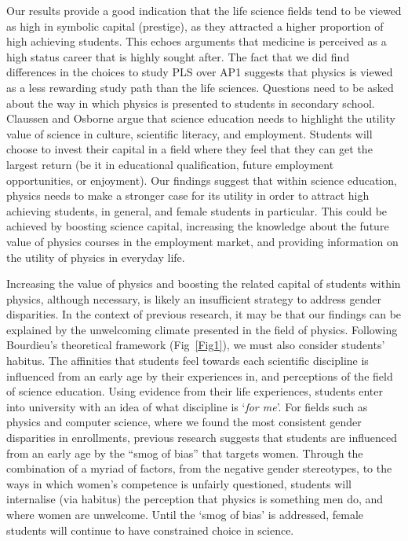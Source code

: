 Our results provide a good indication that the life science fields tend to be viewed as high in symbolic capital (prestige), as they attracted a higher proportion of high achieving students. This echoes arguments that medicine is perceived as a high status career that is highly sought after.\cite{Wong2012} The fact that we did find differences in the choices to study PLS over AP1 suggests that physics is viewed as a less rewarding study path than the life sciences. Questions need to be asked about the way in which physics is presented to students in secondary school. Claussen and Osborne\cite{Claussen_2013} argue that science education needs to highlight the utility value of science in culture, scientific literacy, and employment. Students will choose to invest their capital in a field where they feel that they can get the largest return (be it in educational qualification, future employment opportunities, or enjoyment). Our findings suggest that within science education, physics needs to make a stronger case for its utility in order to attract high achieving students, in general, and female students in particular. This could be achieved by boosting science capital\cite{Archer2015a}, increasing the knowledge about the future value of physics courses in the employment market\cite{Archer2014}, and providing information on the utility of physics in everyday life. 

Increasing the value of physics and boosting the related capital of students within physics, although necessary, is likely an insufficient strategy to address gender disparities. In the context of previous research, it may be that our findings can be explained by the unwelcoming climate presented in the field of physics.\cite{Blickenstaff_2005, Kost_Smith_2010} Following Bourdieu's theoretical framework (Fig~\ref{Fig1}), we must also consider students' habitus. The affinities that students feel towards each scientific discipline is influenced from an early age by their experiences in, and perceptions of the field of science education. Using evidence from their life experiences, students enter into university with an idea of what discipline is `\textit{for me}'. For fields such as physics and computer science, where we found the most consistent gender disparities in enrollments, previous research suggests that students are influenced from an early age by the ``smog of bias''\cite{Kost_Smith_2010} that targets women. Through the combination of a myriad of factors, from the negative gender stereotypes\cite{Nosek_2009}, to the ways in which women's competence is unfairly questioned\cite{Moss_2012,Potvin_2016, ong2005body}, students will internalise (via habitus) the perception that physics is something men do, and where women are unwelcome.\cite{Archer_2013} Until the `smog of bias' is addressed, female students will continue to have constrained choice in science.

